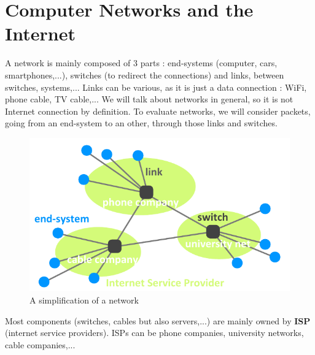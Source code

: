 \documentclass[12pt,a4paper]{article}
\begin{document}
\section{Computer Networks and the Internet}
A network is mainly composed of 3 parts : end-systems (computer, cars, smartphones,...), switches (to redirect the connections) and links, between switches, systems,... Links can be various, as it is just a data connection : WiFi, phone cable, TV cable,... We will talk about networks in general, so it is not Internet connection by definition. To evaluate networks, we will consider packets, going from an end-system to an other, through those links and switches.
\begin{figure}[!h]
	\centering
	\includegraphics[scale=0.5]{images/general_system}
	\caption{A simplification of a network}
	\label{fig: general network}
\end{figure}
Most components (switches, cables but also servers,...) are mainly owned by \textbf{ISP} (internet service providers). ISPs can be phone companies, university networks, cable companies,...
\end{document}
